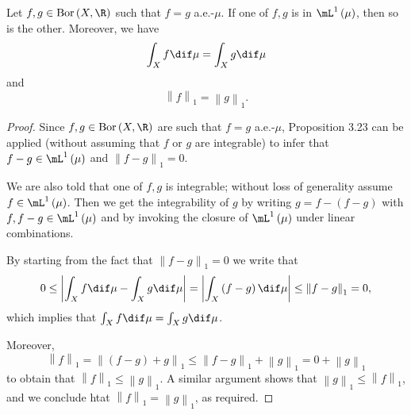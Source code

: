 \documentclass[pmath450]{subfiles}
\begin{document}
    \begin{prop}{}
        Let $f,g\in\bor\left( X,\R \right)$ such that $f=g$ a.e.-$\mu$. If one of $f,g$ is in $\lone\left( \mu \right)$, then so is the other. Moreover, we have
        \begin{equation*}
            \int_Xf\dif\mu = \int_Xg\dif\mu
        \end{equation*}
        and
        \begin{equation*}
            \left\lVert f\right\rVert_1=\left\lVert g \right\rVert_{1}.
        \end{equation*}
    \end{prop}

    \begin{proof}
        Since $f,g\in\bor\left( X,\R \right)$ are such that $f=g$ a.e.-$\mu$, Proposition 3.23 can be applied (without assuming that $f$ or $g$ are integrable) to infer that $f-g\in\lone\left( \mu \right)$ and $\left\lVert f-g \right\rVert_{1}=0$.

        We are also told that one of $f,g$ is integrable; without loss of generality assume $f\in\lone\left( \mu \right)$. Then we get the integrability of $g$ by writing $g=f-\left( f-g \right)$ with $f,f-g\in\lone\left( \mu \right)$ and by invoking the closure of $\lone\left( \mu \right)$ under linear combinations.

        By starting from the fact that $\left\lVert f-g \right\rVert_{1}=0$ we write that
        \begin{equation*}
            0\leq \left| \int_Xf\dif\mu - \int_Xg\dif\mu \right| = \left| \int_X\left( f-g \right)\dif\mu \right|\leq \left\lVert f-g \right\rVert_{1}=0,
        \end{equation*}
        which implies that $\int_Xf\dif\mu = \int_Xg\dif\mu$.

        Moreover,
        \begin{equation*}
            \left\lVert f \right\rVert_{1} = \left\lVert \left( f-g \right)+g \right\rVert_{1} \leq \left\lVert f-g \right\rVert_{1}+\left\lVert g \right\rVert_{1}=0+\left\lVert g \right\rVert_{1}
        \end{equation*}
        to obtain that $\left\lVert f \right\rVert_{1}\leq \left\lVert g \right\rVert_{1}$. A similar argument shows that $\left\lVert g \right\rVert_{1}\leq \left\lVert f \right\rVert_{1}$, and we conclude htat $\left\lVert f \right\rVert_{1}=\left\lVert g \right\rVert_{1}$, as required.
    \end{proof}
\end{document}
